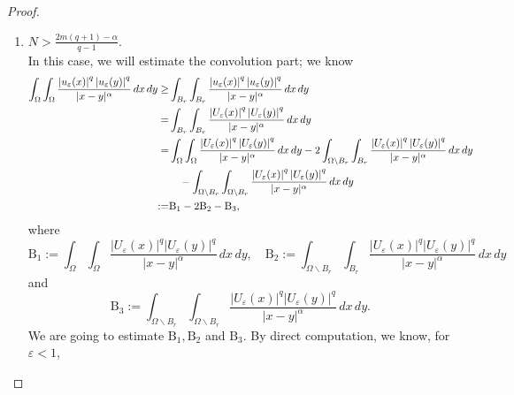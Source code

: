 \documentclass[10pt,a4paper]{amsart}
\newcommand{\Om}{\Omega}
\newcommand{\al} {\alpha}
\newcommand{\eps}{\varepsilon}
\begin{document}
\begin{proof}\begin{enumerate}
\item $N>\frac{2m(q+1)-\al}{q-1}$.\\
In this case, we will estimate the convolution part; we know
 \begin{align}\label{e14}
\int_{\Om} \int_{\Om} \frac{\left|u_{\eps}(x)\right|^q\left|u_{\eps}(y)\right|^q}{|x-y|^\al} \, dx \, dy \geq & \int_{B_r} \int_{B_r} \frac{\left|u_{\eps}(x)\right|^q\left|u_{\eps}(y)\right|^q}{|x-y|^\al} \, dx \, dy \notag\\
= & \int_{B_r} \int_{B_r} \frac{\left|U_{\eps}(x)\right|^q\left|U_{\eps}(y)\right|^q}{|x-y|^\al} \, dx \, dy \notag\\
= & \int_{\Om} \int_{\Om} \frac{\left|U_{\eps}(x)\right|^q\left|U_{\eps}(y)\right|^q}{|x-y|^\al} \, dx \, dy-2 \int_{\Om \backslash B_r}\int_{B_r} \frac{\left|U_{\eps}(x)\right|^q\left|U_{\eps}(y)\right|^q}{|x-y|^\al} \, dx \, dy \notag\\
& \quad-\int_{\Om \backslash B_r}\int_{\Om \backslash B_r} \frac{\left|U_{\eps}(x)\right|^q\left|U_{\eps}(y)\right|^q}{|x-y|^\al} \, dx \, dy \\
:= & \mathrm{B_1}-2 \mathrm{B_2}-\mathrm{B_3},\notag
\end{align}
where
\[\mathrm{B_1}:=\int_{\Om} \int_{\Om} \frac{\left|U_{\eps}(x)\right|^q\left|U_{\eps}(y)\right|^q}{|x-y|^\al} \, dx \, dy, \quad \mathrm{B_2}:=\int_{\Om \backslash B_r} \int_{B_r}\frac{\left|U_{\eps}(x)\right|^q\left|U_{\eps}(y)\right|^q}{|x-y|^\al}\, dx \, dy\]
and
\[\mathrm{B_3}:=\int_{\Om \backslash B_r}\int_{\Om \backslash B_r} \frac{\left|U_{\eps}(x)\right|^q\left|U_{\eps}(y)\right|^q}{|x-y|^\al} \, dx \, dy .\]
We are going to estimate $\mathrm{B_1}, \mathrm{B_2}$ and $\mathrm{B_3}$. By direct computation, we know, for $\eps<1$,


\end{enumerate}
\end{proof}
\end{document}
